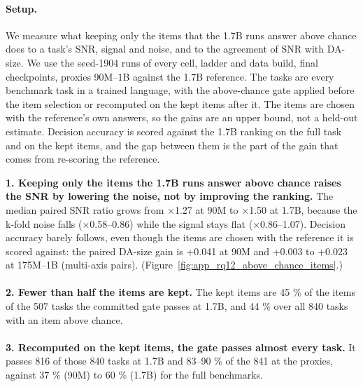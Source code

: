 {\begin{minipage}[t]{0.485\textwidth}
\paragraph{Setup.} We measure what keeping only the items that the 1.7B runs answer above chance does to a task's SNR, signal and noise, and to the agreement of SNR with DA-size. We use the seed-1904 runs of every cell, ladder and data build, final checkpoints, proxies 90M--1B against the 1.7B reference. The tasks are every benchmark task in a trained language, with the above-chance gate applied before the item selection or recomputed on the kept items after it. The items are chosen with the reference's own answers, so the gains are an upper bound, not a held-out estimate. Decision accuracy is scored against the 1.7B ranking on the full task and on the kept items, and the gap between them is the part of the gain that comes from re-scoring the reference.
\end{minipage}\hfill
\begin{minipage}[t]{0.485\textwidth}
\vspace{0pt}
\begin{rqfinding}
\textbf{1. Keeping only the items the 1.7B runs answer above chance raises the SNR by lowering the noise, not by improving the ranking.} The median paired SNR ratio grows from $\times$1.27 at 90M to $\times$1.50 at 1.7B, because the k-fold noise falls ($\times$0.58--0.86) while the signal stays flat ($\times$0.86--1.07). Decision accuracy barely follows, even though the items are chosen with the reference it is scored against: the paired DA-size gain is +0.041 at 90M and +0.003 to +0.023 at 175M--1B (multi-axis pairs). (Figure~\ref{fig:app_rq12_above_chance_items}.)
\\
\\
\textbf{2. Fewer than half the items are kept.} The kept items are 45 \% of the items of the 507 tasks the committed gate passes at 1.7B, and 44 \% over all 840 tasks with an item above chance.
\\
\\
\textbf{3. Recomputed on the kept items, the gate passes almost every task.} It passes 816 of those 840 tasks at 1.7B and 83--90 \% of the 841 at the proxies, against 37 \% (90M) to 60 \% (1.7B) for the full benchmarks.
\end{rqfinding}
\end{minipage}

}
